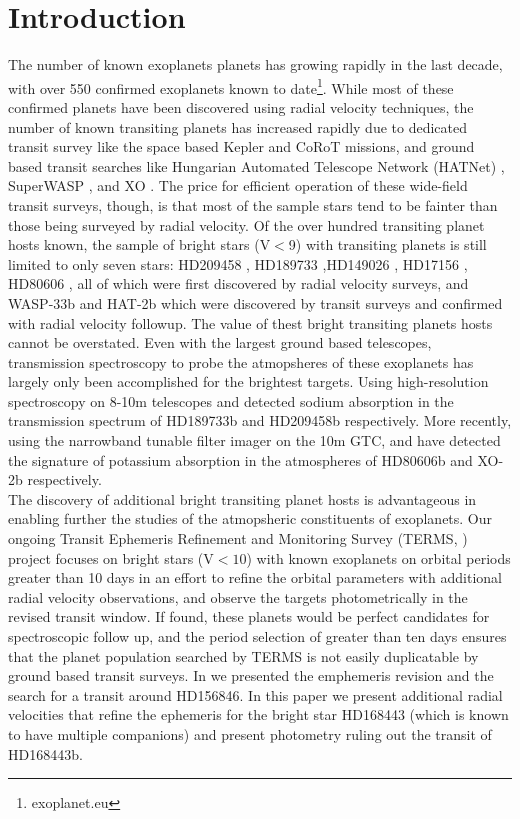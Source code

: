 \documentclass[12pt,preprint]{emulateapj}
\begin{document}
\section{Introduction}
\label{introduction}
\indent The number of known exoplanets planets has growing rapidly in the last decade, with over 550 confirmed exoplanets known to date\footnote{exoplanet.eu}. While most of these confirmed planets have been discovered using radial velocity techniques, the number of known transiting planets has increased rapidly due to dedicated transit survey like the space based   Kepler  \citep{Borucki11} and CoRoT \citet{Barge08} missions, and ground based transit searches like Hungarian Automated Telescope Network (HATNet)\citet{Bakos04} , SuperWASP \cite{Pollacco06}, and XO \citep{McCullough05}. The price for efficient operation of  these wide-field transit surveys, though, is that most of the sample stars tend to be fainter than those being surveyed by radial velocity. Of the over hundred transiting planet hosts known, the sample of bright stars  (V$<$9) with transiting planets is still limited to only seven stars:  HD209458 \citep{Charbonneau00, Henry00}, HD189733 \citep{Bouchy05} ,HD149026 \citep{Sato05}, HD17156 \citep{Barbieri07}, HD80606 \citep{Moutou09, Fossey09}, all of which were first discovered by radial velocity surveys, and WASP-33b and HAT-2b which were discovered by transit surveys and confirmed with radial velocity followup. The value of thest bright transiting planets hosts cannot be overstated. Even with the largest ground based telescopes, transmission spectroscopy to probe the atmopsheres of these exoplanets has largely only been accomplished for the brightest targets. Using high-resolution spectroscopy on 8-10m telescopes \citet{Redfield08}  and \citet{Snellen08} detected sodium absorption in the transmission spectrum of HD189733b and HD209458b respectively.  More recently, using the narrowband tunable filter imager on the 10m GTC, \citet{Colon10} and \citet{Sing11} have detected the signature of potassium absorption in the atmospheres of HD80606b and XO-2b respectively. \\
\indent The discovery of additional bright transiting planet hosts is advantageous in enabling further the studies of the atmopsheric constituents of exoplanets. Our ongoing Transit Ephemeris Refinement and Monitoring Survey (TERMS, \citet{Kane09}) project focuses on bright stars (V$<10$) with known exoplanets on orbital periods greater than 10 days in an effort to refine the orbital parameters with additional radial velocity observations, and observe the targets photometrically in the revised transit window. If found, these planets would be perfect candidates for spectroscopic follow up, and the  period selection of greater than ten days ensures that the planet population searched by TERMS is not easily duplicatable by ground based transit surveys. In \citet{Kane11} we presented the emphemeris revision and  the search for a transit around HD156846. In this paper we present additional radial velocities that refine the ephemeris for the bright star HD168443 (which is known to have multiple companions) and present photometry ruling out the transit of HD168443b. 
\end{document}
